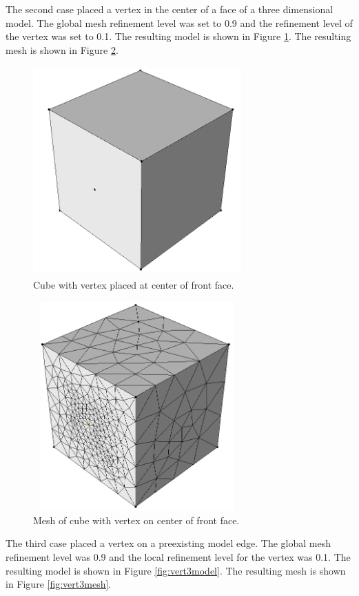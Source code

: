\documentclass[a4paper, 12pt]{article}
\begin{document}
The second case placed a vertex in the center of a face of 
a three dimensional 
model. The global mesh refinement level was set to 0.9 and the refinement
level of the vertex was set to 0.1. 
The resulting model is shown in Figure \ref{fig:vert2model}.
The resulting mesh is shown in Figure \ref{fig:vert2mesh}.

\begin{figure}[H]
  \centering
  \includegraphics[width=8cm, height=8cm]{test4_smd}
  \caption{Cube with vertex placed at center of front face.}
  \label{fig:vert2model}
\end{figure}

\begin{figure}[H]
  \centering
  \includegraphics[width=8cm, height=8cm]{test4_sms}
  \caption{Mesh of cube with vertex on center of front face.}
  \label{fig:vert2mesh}
\end{figure}

The third case placed a vertex on a preexisting model edge. The global
mesh refinement level was 0.9 and the local refinement level for the
vertex was 0.1.
The resulting model is shown in Figure \ref{fig:vert3model}.
The resulting mesh is shown in Figure \ref{fig:vert3mesh}.
\end{document}

